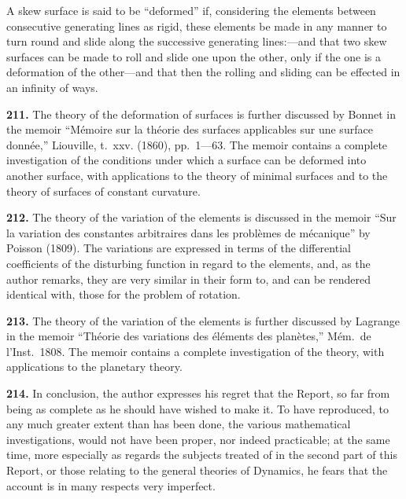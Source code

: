 \documentclass[11pt,a4paper]{book}
\begin{document}
A skew surface is said to be ``deformed'' if, considering the elements between consecutive generating lines as rigid, these elements be made in any manner to turn round and slide along the successive generating lines:---and that two skew surfaces can be made to roll and slide one upon the other, only if the one is a deformation of the other---and that then the rolling and sliding can be effected in an infinity of ways.

\vspace{1em}

\noindent\textbf{211.} The theory of the deformation of surfaces is further discussed by Bonnet in the memoir ``M\'{e}moire sur la th\'{e}orie des surfaces applicables sur une surface donn\'{e}e,'' Liouville, t.~xxv. (1860), pp.~1---63. The memoir contains a complete investigation of the conditions under which a surface can be deformed into another surface, with applications to the theory of minimal surfaces and to the theory of surfaces of constant curvature.

\vspace{1em}

\noindent\textbf{212.} The theory of the variation of the elements is discussed in the memoir ``Sur la variation des constantes arbitraires dans les probl\`{e}mes de m\'{e}canique'' by Poisson (1809). The variations are expressed in terms of the differential coefficients of the disturbing function in regard to the elements, and, as the author remarks, they are very similar in their form to, and can be rendered identical with, those for the problem of rotation.

\vspace{1em}

\noindent\textbf{213.} The theory of the variation of the elements is further discussed by Lagrange in the memoir ``Th\'{e}orie des variations des \'{e}l\'{e}ments des plan\`{e}tes,'' M\'{e}m.~de l'Inst.~1808. The memoir contains a complete investigation of the theory, with applications to the planetary theory.

\vspace{1em}

\noindent\textbf{214.} In conclusion, the author expresses his regret that the Report, so far from being as complete as he should have wished to make it. To have reproduced, to any much greater extent than has been done, the various mathematical investigations, would not have been proper, nor indeed practicable; at the same time, more especially as regards the subjects treated of in the second part of this Report, or those relating to the general theories of Dynamics, he fears that the account is in many respects very imperfect.
\end{document}
